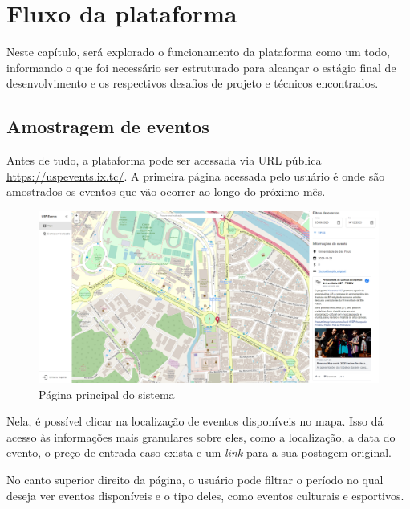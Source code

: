 
\chapter{Fluxo da plataforma}

Neste capítulo, será explorado o funcionamento da plataforma como um todo,
informando o que foi necessário ser estruturado para alcançar o estágio final
de desenvolvimento e os respectivos desafios de projeto e técnicos encontrados.

\section{Amostragem de eventos}
\label{sec:EventsSampling}

Antes de tudo, a plataforma pode ser acessada via \acs{URL}\label{acro:URL}
pública \url{https://uspevents.ix.tc/}. A primeira página acessada pelo usuário
é onde são amostrados os eventos que vão ocorrer ao longo do próximo mês.

\begin{figure}[h]
    \centering
    \includegraphics[width=1\textwidth]{figuras/pagina_inicial.png}
    \caption{Página principal do sistema}
\end{figure}

Nela, é possível clicar na localização de eventos disponíveis no mapa. Isso dá
acesso às informações mais granulares sobre eles, como a localização, a data do
evento, o preço de entrada caso exista e um \textit{link} para a sua postagem
original.

No canto superior direito da página, o usuário pode filtrar o período no qual
deseja ver eventos disponíveis e o tipo deles, como eventos culturais e
esportivos.

